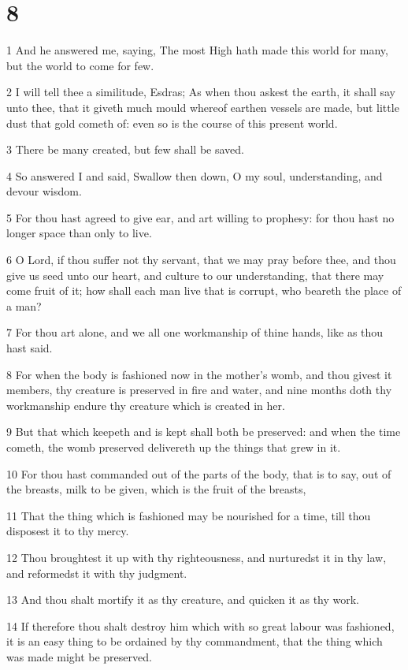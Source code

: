 \chapter{8}

\par 1 And he answered me, saying, The most High hath made this world for many, but the world to come for few.
\par 2 I will tell thee a similitude, Esdras; As when thou askest the earth, it shall say unto thee, that it giveth much mould whereof earthen vessels are made, but little dust that gold cometh of: even so is the course of this present world.
\par 3 There be many created, but few shall be saved.
\par 4 So answered I and said, Swallow then down, O my soul, understanding, and devour wisdom.
\par 5 For thou hast agreed to give ear, and art willing to prophesy: for thou hast no longer space than only to live.
\par 6 O Lord, if thou suffer not thy servant, that we may pray before thee, and thou give us seed unto our heart, and culture to our understanding, that there may come fruit of it; how shall each man live that is corrupt, who beareth the place of a man?
\par 7 For thou art alone, and we all one workmanship of thine hands, like as thou hast said.
\par 8 For when the body is fashioned now in the mother's womb, and thou givest it members, thy creature is preserved in fire and water, and nine months doth thy workmanship endure thy creature which is created in her.
\par 9 But that which keepeth and is kept shall both be preserved: and when the time cometh, the womb preserved delivereth up the things that grew in it.
\par 10 For thou hast commanded out of the parts of the body, that is to say, out of the breasts, milk to be given, which is the fruit of the breasts,
\par 11 That the thing which is fashioned may be nourished for a time, till thou disposest it to thy mercy.
\par 12 Thou broughtest it up with thy righteousness, and nurturedst it in thy law, and reformedst it with thy judgment.
\par 13 And thou shalt mortify it as thy creature, and quicken it as thy work.
\par 14 If therefore thou shalt destroy him which with so great labour was fashioned, it is an easy thing to be ordained by thy commandment, that the thing which was made might be preserved.
